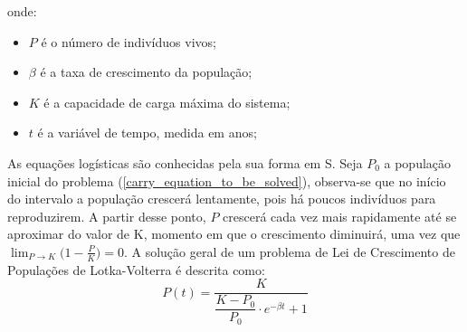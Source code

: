 onde:\begin{itemize}
\item $P$ é o número de indivíduos vivos; 
\item $\beta$ é a taxa de crescimento da população;
\item $K$ é a capacidade de carga máxima do sistema;
\item $t$ é a variável de tempo, medida em anos;
\end{itemize}

As equações logísticas são conhecidas pela sua forma em S. Seja $P_0$ a população inicial do problema (\ref{carry_equation_to_be_solved}), observa-se que no início do intervalo a população crescerá lentamente, pois há poucos indivíduos para reproduzirem. A partir desse ponto, $P$ crescerá cada vez mais rapidamente até se aproximar do valor de K, momento em que o crescimento diminuirá, uma vez que $\lim_{P\to K} \big(1 - \frac{P}{K}\big) = 0$. A solução geral de um problema de Lei de Crescimento de Populações de Lotka-Volterra é descrita como:
\begin{equation*}
 P(t) = \dfrac{K}{\dfrac{K - P_0}{P_0} \cdot e^{-\beta t} + 1}
\end{equation*}

